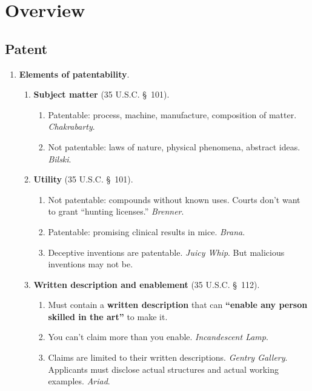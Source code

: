 \section{Overview}

\subsection{Patent}

\begin{enumerate}
    \item \textbf{Elements of patentability}.
    \begin{enumerate}
        \item \textbf{Subject matter} (35 U.S.C. \S\ 101).
        \begin{enumerate}
            \item Patentable: process, machine, manufacture, composition of 
            matter. \emph{Chakrabarty}.
            \item Not patentable: laws of nature, physical phenomena, abstract 
            ideas. \emph{Bilski}.
        \end{enumerate}
        \item \textbf{Utility} (35 U.S.C. \S\ 101).
        \begin{enumerate}
            \item Not patentable: compounds without known uses.  Courts don't 
            want to grant ``hunting licenses.'' \emph{Brenner}.  \item 
            Patentable: promising clinical results in mice. 
            \emph{Brana}.
            \item Deceptive inventions are patentable. \emph{Juicy Whip}. But 
            malicious inventions may not be.
        \end{enumerate}
        \item \textbf{Written description and enablement} (35 U.S.C. \S\ 112).
        \begin{enumerate}
            \item Must contain a \textbf{written description} that can 
            \textbf{``enable any person skilled in the art''} to make it.
            \item You can't claim more than you enable. \emph{Incandescent 
            Lamp}.
            \item Claims are limited to their written descriptions. 
            \emph{Gentry Gallery}. Applicants must disclose actual structures 
            and actual working examples. \emph{Ariad}.

\end{enumerate}
\end{enumerate}
\end{enumerate}
